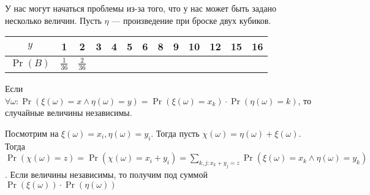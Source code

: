 У нас могут начаться проблемы из-за того, что у нас может быть задано несколько величин. Пусть $\eta$ --- произведение при броске двух кубиков.
\begin{center}
\begin{tabular}{|c|c|c|c|c|c|c|c|c|c|c|c|c|}
    \hline
     $y$ & 1 & 2 & 3 & 4 & 5 & 6 & 8 & 9 & 10 & 12 & 15 & 16 \\     \hline
     $\Pr(B)$ & $\frac{1}{36}$ & $\frac{2}{36}$ & & & & & & & & & & \\ \hline
\end{tabular}
\end{center}
\begin{definition}
Если $\forall \omega: \Pr(\xi(\omega)=x \land \eta(\omega)=y) = \Pr(\xi(\omega)=x_k) \cdot \Pr(\eta(\omega) = k)$, то случайные величины независимы.
\end{definition}
\slashn
Посмотрим на $\xi(\omega) = x_i, \eta(\omega) = y_i$. Тогда пусть  $\chi(\omega) = \eta(\omega) + \xi(\omega)$. Тогда $\Pr(\chi(\omega) = z) = \Pr(\chi(\omega) = x_i + y_i) = \sum_{k, j: x_k + y_j = z} \Pr(\xi(\omega) = x_k \land \eta(\omega) = y_k)$. Если величины независимы, то получим  под суммой $\Pr(\xi(\omega)) \cdot \Pr(\eta(\omega))$
